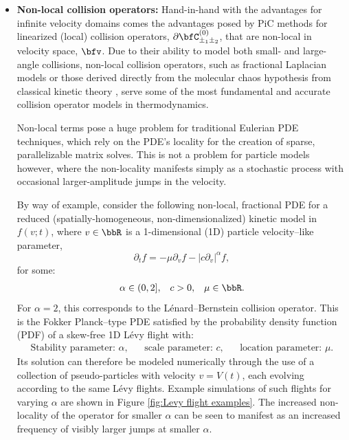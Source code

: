 \begin{itemize}
        \item  {\bf Non-local collision operators:} Hand-in-hand with the advantages for infinite velocity domains comes the advantages posed by PiC methods for linearized (local) collision operators, $\partial\bfC_{\pm_{1}\pm_{2}}^{(0)}$, that are non-local in velocity space, $\bfv$. Due to their ability to model both small- and large-angle collisions, non-local collision operators, such as fractional Laplacian models \cite{Cho_2015, Sakomoto_2016, Kiselev_Schmalian_2019} or those derived directly from the molecular chaos hypothesis from classical kinetic theory \cite{Lerner_Trigg_1991}, serve some of the most fundamental and accurate collision operator models in thermodynamics. 
        
        Non-local terms pose a huge problem for traditional Eulerian PDE techniques, which rely on the PDE's locality for the creation of sparse, parallelizable matrix solves. This is not a problem for particle models however, where the non-locality manifests simply as a stochastic process with occasional larger-amplitude jumps in the velocity.

        By way of example, consider the following non-local, fractional PDE for a reduced (spatially-homogeneous, non-dimensionalized) kinetic model in $f(v; t)$, where $v  \in  \bbR$ is a 1-dimensional (1D) particle velocity--like parameter,
        \begin{equation}\label{eqn:reduced Boltzmann equation}
            \partial_{t}f  =  - \mu\partial_{v}f - |c\partial_{v}|^{\alpha}f,
        \end{equation}
        for some:
        \begin{align*}
            \alpha  \in  (0, 2],  &&
            c       >    0,       &&
            \mu     \in  \bbR.
        \end{align*}
        For $\alpha  =  2$, this corresponds to the Lénard--Bernstein collision operator.  This is the Fokker Planck--type PDE satisfied by the probability density function (PDF) of a skew-free 1D Lévy flight \cite{Chechkin_et_al_2008} with:
        \begin{align*}
            \text{Stability parameter: } \alpha,  &&
            \text{scale parameter: } c,           &&
            \text{location parameter: } \mu.
        \end{align*}
        Its solution can therefore be modeled numerically through the use of a collection of pseudo-particles with velocity $v  =  V(t)$, each evolving according to the same Lévy flights. Example simulations of such flights for varying $\alpha$ are shown in Figure \ref{fig:Levy flight examples}. The increased non-locality of the operator for smaller $\alpha$ can be seen to manifest as an increased frequency of visibly larger jumps at smaller $\alpha$.


\end{itemize}
